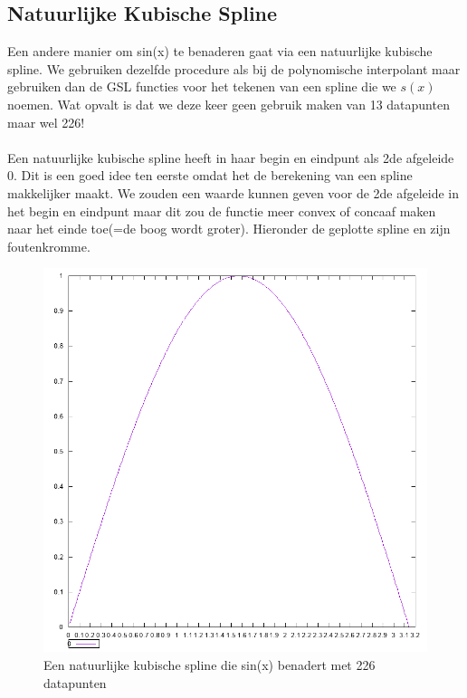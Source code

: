 \documentclass[10pt,a4paper]{article}
\begin{document}
\subsection{Natuurlijke Kubische Spline}
Een andere manier om sin(x) te benaderen gaat via een natuurlijke kubische spline. We gebruiken dezelfde procedure als bij de polynomische interpolant maar gebruiken dan de GSL functies voor het tekenen van een spline die we $s(x)$ noemen. Wat opvalt is dat we deze keer geen gebruik maken van 13 datapunten maar wel 226!
\\
\\
Een natuurlijke kubische spline heeft in haar begin en eindpunt als 2de afgeleide 0. Dit is een goed idee ten eerste omdat het de berekening van een spline makkelijker maakt. We zouden een waarde kunnen geven voor de 2de afgeleide in het begin en eindpunt maar dit zou de functie meer convex of concaaf maken naar het einde toe(=de boog wordt groter).  Hieronder de geplotte spline en zijn foutenkromme.
\begin{figure}[H]
\centering
\includegraphics[scale=0.42]{../Onegraphs/Spline-Interpolated.png}
\caption{Een natuurlijke kubische spline die sin(x) benadert met 226 datapunten}
\end{figure}
\end{document}

